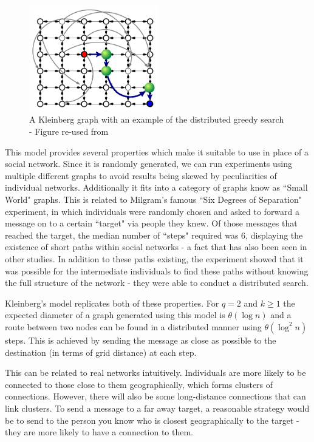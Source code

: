 \documentclass[bsc,frontabs,twoside,singlespacing,parskip,deptreport]{infthesis}     %
\begin{document}
\begin{figure}[]
  \centering
    \includegraphics[width=0.5\textwidth]{Schabanel11_Kleinbergs_Network}
  \caption{A Kleinberg graph with an example of the distributed greedy search - Figure re-used from \cite{Schabanel11}}
\end{figure}

This model provides several properties which make it suitable to use in place of a social network. Since it is randomly generated, we can run experiments using multiple different graphs to avoid results being skewed by peculiarities of individual networks. Additionally it fits into a category of graphs know as ``Small World" graphs. This is related to Milgram's famous ``Six Degrees of Separation" experiment\cite{Milgram67,TraversMilgram69}, in which individuals were randomly chosen and asked to forward a message on to a certain ``target" via people they knew. Of those messages that reached the target, the median number of ``steps" required was 6, displaying the existence of short paths within social networks - a fact that has also been seen in other studies\cite{MilgramBackup1,MilgramBackup2}. In addition to these paths existing, the experiment showed that it was possible for the intermediate individuals to find these paths without knowing the full structure of the network - they were able to conduct a distributed search. 

Kleinberg's model replicates both of these properties. For $q = 2$ and $k \ge 1$ the expected diameter of a graph generated using this model is $\theta (\log n)$ and a route between two nodes can be found in a distributed manner using $\theta (\log^{2}n)$ steps\cite{AnalyzingKleinberg}. This is achieved by sending the message as close as possible to the destination (in terms of grid distance) at each step.

This can be related to real networks intuitively. Individuals are more likely to be connected to those close to them geographically, which forms clusters of connections. However, there will also be some long-distance connections that can link clusters. To send a message to a far away target, a reasonable strategy would be to send to the person you know who is closest geographically to the target - they are more likely to have a connection to them.
\end{document}
